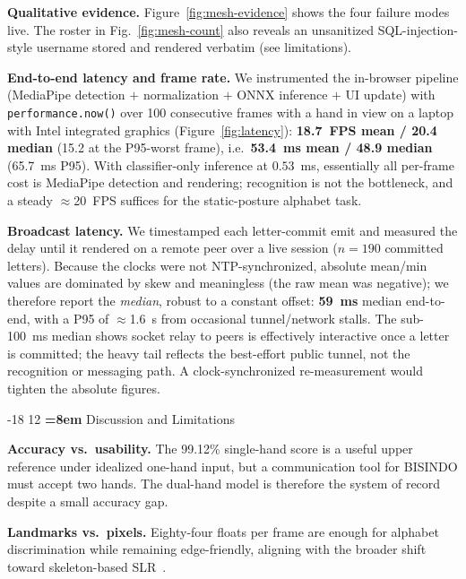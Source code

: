 \documentclass{llncs}
\makeatletter
\renewcommand\section{\@startsection{section}{1}{\z@}%
                      {-18\p@ \@plus -4\p@ \@minus -4\p@}%
                      {12\p@ \@plus 4\p@ \@minus 4\p@}%
                      {\normalfont\Large\bfseries\boldmath
                       \rightskip=\z@ \@plus 8em\pretolerance=10000 }}
\makeatother
\begin{document}
\textbf{Qualitative evidence.} Figure~\ref{fig:mesh-evidence}
shows the four failure modes live. The roster in
Fig.~\ref{fig:mesh-count} also reveals an unsanitized
SQL-injection-style username stored and rendered verbatim (see
limitations).

\textbf{End-to-end latency and frame rate.} We instrumented the
in-browser pipeline (MediaPipe detection $+$ normalization $+$ ONNX
inference $+$ UI update) with \texttt{performance.now()} over 100
consecutive frames with a hand in view on a laptop with Intel integrated
graphics (Figure~\ref{fig:latency}): \textbf{18.7~FPS mean / 20.4 median}
(15.2 at the P95-worst frame), i.e.\ \textbf{53.4~ms mean / 48.9 median}
(65.7~ms P95). With classifier-only inference at $0.53$~ms, essentially
all per-frame cost is MediaPipe detection and rendering; recognition is
not the bottleneck, and a steady $\approx$20~FPS suffices for the
static-posture alphabet task.

\textbf{Broadcast latency.} We timestamped each letter-commit
emit and measured the delay until it rendered on
a remote peer over a live session ($n=190$ committed letters). Because the
clocks were not NTP-synchronized, absolute mean/min values are dominated by
skew and meaningless (the raw mean was negative); we therefore report the
\emph{median}, robust to a constant offset: \textbf{59~ms} median
end-to-end, with a P95 of $\approx$1.6~s from occasional tunnel/network
stalls. The sub-100~ms median shows socket relay to peers is effectively
interactive once a letter is committed; the heavy tail reflects the
best-effort public tunnel, not the recognition or messaging path. A
clock-synchronized re-measurement would tighten the absolute figures.


\section{Discussion and Limitations}
\label{sec:limitation}

\textbf{Accuracy vs.\ usability.} The 99.12\% single-hand score is a
useful upper reference under idealized one-hand input, but a communication
tool for BISINDO must accept two hands. The dual-hand model is therefore
the system of record despite a small accuracy gap.

\textbf{Landmarks vs.\ pixels.} Eighty-four floats per frame are enough
for alphabet discrimination while remaining edge-friendly, aligning with
the broader shift toward skeleton-based SLR~\cite{deep-survey}.
\end{document}
